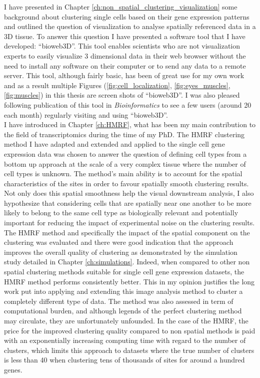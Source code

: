 I have presented in Chapter \ref{ch:non_spatial_clustering_visualization} some background about clustering single cells based on their gene expression patterns and outlined the question of visualization to analyse spatially referenced data in a 3D tissue. To answer this question I have presented a software tool that I have developed: ``bioweb3D''. This tool enables scientists who are not visualization experts to easily visualize 3 dimensional data in their web browser without the need to install any software on their computer or to send any data to a remote server. This tool, although fairly basic, has been of great use for my own work and as a result multiple Figures (\ref{fig:cell_localization}, \ref{fig:eyes_muscles}, \ref{fig:muscles}) in this thesis are screen shots of ``bioweb3D''. I was also pleased following publication of this tool in \emph{Bioinformatics} \cite{Pettit13} to see a few users (around 20 each month) regularly visiting and using ``bioweb3D''.\\


I have introduced in Chapter \ref{ch:HMRF}, what has been my main contribution to the field of transcriptomics during the time of my PhD. The HMRF clustering method I have adapted and extended and applied to the single cell gene expression data was chosen to answer the question of defining cell types from a bottom up approach at the scale of a very complex tissue where the number of cell types is unknown. The method's main ability is to account for the spatial characteristics of the sites in order to favour spatially smooth clustering results. Not only does this spatial smoothness help the visual downstream analysis, I also hypothesize that considering cells that are spatially near one another to be more likely to belong to the same cell type as biologically relevant and potentially important for reducing the impact of experimental noise on the clustering results.\\

 The HMRF method and specifically the impact of the spatial component on the clustering was evaluated and there were good indication that the approach improves the overall quality of clustering as demonstrated by the simulation study detailed in Chapter \ref{ch:simulations}. Indeed, when compared to other non spatial clustering methods suitable for single cell gene expression datasets, the HMRF method performs consistently better. This in my opinion justifies the long work put into applying and extending this image analysis method to cluster a completely different type of data. The method was also assessed in term of computational burden, and although legends of the perfect clustering method may circulate, they are unfortunately unfounded. In the case of the HMRF, the price for the improved clustering quality compared to non spatial methods is paid with an exponentially increasing computing time with regard to the number of clusters, which limits this approach to datasets where the true number of clusters is less than 40 when clustering tens of thousands of sites for around a hundred genes. \\
 
